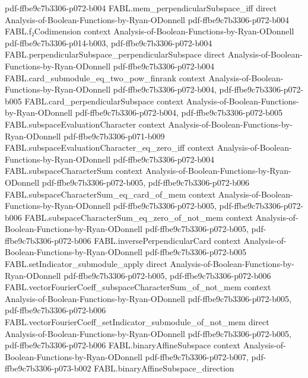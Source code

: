 \begin{theorem}
  {pdf-ffbe9c7b3306-p072-b004}
\proofstep
  {FABL.mem_perpendicularSubspace_iff}
  {direct}
  {Analysis-of-Boolean-Functions-by-Ryan-ODonnell}
  {pdf-ffbe9c7b3306-p072-b004}
\proofstep
  {FABL.f₂Codimension}
  {context}
  {Analysis-of-Boolean-Functions-by-Ryan-ODonnell}
  {pdf-ffbe9c7b3306-p014-b003,
    pdf-ffbe9c7b3306-p072-b004}
\proofstep
  {FABL.perpendicularSubspace_perpendicularSubspace}
  {direct}
  {Analysis-of-Boolean-Functions-by-Ryan-ODonnell}
  {pdf-ffbe9c7b3306-p072-b004}
\proofstep
  {FABL.card_submodule_eq_two_pow_finrank}
  {context}
  {Analysis-of-Boolean-Functions-by-Ryan-ODonnell}
  {pdf-ffbe9c7b3306-p072-b004,
    pdf-ffbe9c7b3306-p072-b005}
\proofstep
  {FABL.card_perpendicularSubspace}
  {context}
  {Analysis-of-Boolean-Functions-by-Ryan-ODonnell}
  {pdf-ffbe9c7b3306-p072-b004,
    pdf-ffbe9c7b3306-p072-b005}
\proofstep
  {FABL.subspaceEvaluationCharacter}
  {context}
  {Analysis-of-Boolean-Functions-by-Ryan-ODonnell}
  {pdf-ffbe9c7b3306-p071-b009}
\proofstep
  {FABL.subspaceEvaluationCharacter_eq_zero_iff}
  {context}
  {Analysis-of-Boolean-Functions-by-Ryan-ODonnell}
  {pdf-ffbe9c7b3306-p072-b004}
\proofstep
  {FABL.subspaceCharacterSum}
  {context}
  {Analysis-of-Boolean-Functions-by-Ryan-ODonnell}
  {pdf-ffbe9c7b3306-p072-b005,
    pdf-ffbe9c7b3306-p072-b006}
\proofstep
  {FABL.subspaceCharacterSum_eq_card_of_mem}
  {context}
  {Analysis-of-Boolean-Functions-by-Ryan-ODonnell}
  {pdf-ffbe9c7b3306-p072-b005,
    pdf-ffbe9c7b3306-p072-b006}
\proofstep
  {FABL.subspaceCharacterSum_eq_zero_of_not_mem}
  {context}
  {Analysis-of-Boolean-Functions-by-Ryan-ODonnell}
  {pdf-ffbe9c7b3306-p072-b005,
    pdf-ffbe9c7b3306-p072-b006}
\proofstep
  {FABL.inversePerpendicularCard}
  {context}
  {Analysis-of-Boolean-Functions-by-Ryan-ODonnell}
  {pdf-ffbe9c7b3306-p072-b005}
\proofstep
  {FABL.setIndicator_submodule_apply}
  {direct}
  {Analysis-of-Boolean-Functions-by-Ryan-ODonnell}
  {pdf-ffbe9c7b3306-p072-b005,
    pdf-ffbe9c7b3306-p072-b006}
\proofstep
  {FABL.vectorFourierCoeff_subspaceCharacterSum_of_not_mem}
  {context}
  {Analysis-of-Boolean-Functions-by-Ryan-ODonnell}
  {pdf-ffbe9c7b3306-p072-b005,
    pdf-ffbe9c7b3306-p072-b006}
\proofstep
  {FABL.vectorFourierCoeff_setIndicator_submodule_of_not_mem}
  {direct}
  {Analysis-of-Boolean-Functions-by-Ryan-ODonnell}
  {pdf-ffbe9c7b3306-p072-b005,
    pdf-ffbe9c7b3306-p072-b006}
\proofstep
  {FABL.binaryAffineSubspace}
  {context}
  {Analysis-of-Boolean-Functions-by-Ryan-ODonnell}
  {pdf-ffbe9c7b3306-p072-b007,
    pdf-ffbe9c7b3306-p073-b002}
\proofstep
  {FABL.binaryAffineSubspace_direction}

\end{theorem}
